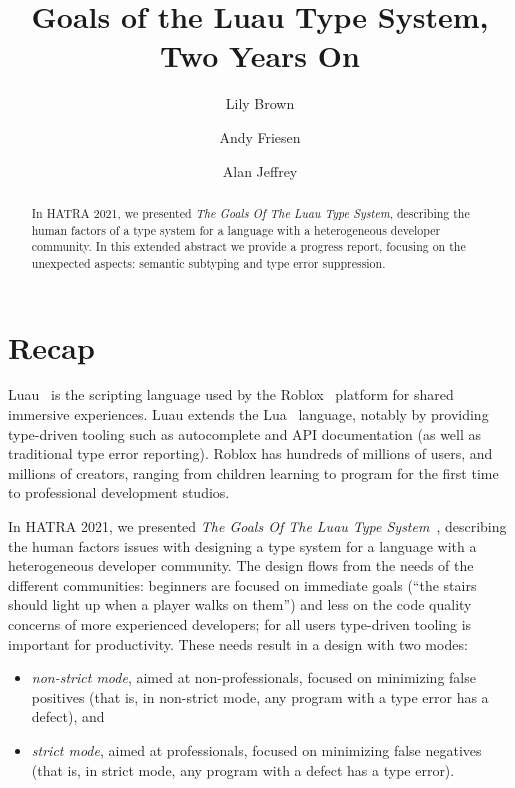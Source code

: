 \documentclass[acmsmall]{acmart}
\begin{document}
\title{Goals of the Luau Type System, Two Years On}

\author{Lily Brown}
\author{Andy Friesen}
\author{Alan Jeffrey}

\begin{abstract}
In HATRA 2021, we presented \emph{The Goals Of The Luau Type System},
describing the human factors of a type system for a
language with a heterogeneous developer community. In this extended
abstract we provide a progress report, focusing on
the unexpected aspects: semantic subtyping and type error
suppression.
\end{abstract}

\maketitle

\section{Recap}

Luau~\cite{Luau} is the scripting language used by the
Roblox~\cite{Roblox} platform for shared immersive experiences.  Luau extends
the Lua~\cite{Lua} language, notably by providing type-driven tooling
such as autocomplete and API documentation (as well as traditional type
error reporting). Roblox has hundreds of millions of users, and
millions of creators, ranging from children learning to program for
the first time to professional development studios.

In HATRA 2021, we presented \emph{The Goals Of The Luau Type
System}~\cite{BFJ21:GoalsLuau}, describing the human factors issues
with designing a type system for a language with a heterogeneous
developer community. The design flows from the needs of the different
communities: beginners are focused on immediate goals (``the stairs
should light up when a player walks on them'') and less on the code
quality concerns of more experienced developers; for all users
type-driven tooling is important for productivity. These needs result in a design with two modes:
\begin{itemize}
\item \emph{non-strict mode}, aimed at non-professionals, focused on
  minimizing false positives (that is, in non-strict mode, any program with a type error has a defect), and
\item \emph{strict mode}, aimed at professionals, focused on
  minimizing false negatives (that is, in strict mode, any program with a defect has a type error).
\end{itemize}
\end{document}
